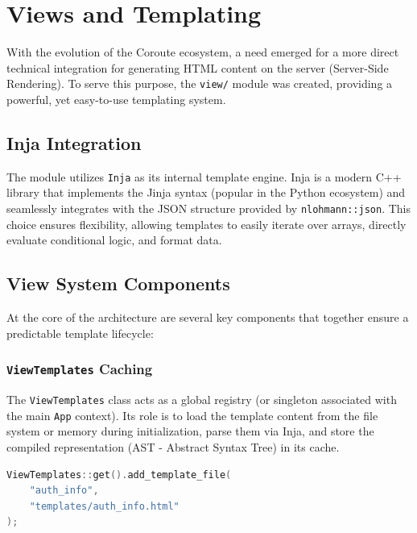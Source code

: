 \section{Views and Templating}
\label{sec:views-templating}

With the evolution of the Coroute ecosystem, a need emerged for a more direct technical integration for generating HTML content on the server (Server-Side Rendering). To serve this purpose, the \texttt{view/} module was created, providing a powerful, yet easy-to-use templating system.

\subsection{Inja Integration}
The module utilizes \texttt{Inja} as its internal template engine. Inja is a modern C++ library that implements the Jinja syntax (popular in the Python ecosystem) and seamlessly integrates with the JSON structure provided by \texttt{nlohmann::json}. This choice ensures flexibility, allowing templates to easily iterate over arrays, directly evaluate conditional logic, and format data.

\subsection{View System Components}

At the core of the architecture are several key components that together ensure a predictable template lifecycle:

\subsubsection{\texttt{ViewTemplates} Caching}
The \texttt{ViewTemplates} class acts as a global registry (or singleton associated with the main \texttt{App} context). Its role is to load the template content from the file system or memory during initialization, parse them via Inja, and store the compiled representation (AST - Abstract Syntax Tree) in its cache.

\begin{lstlisting}[language=C++, basicstyle=\small\ttfamily, caption={Configuring ViewTemplates}]
ViewTemplates::get().add_template_file(
    "auth_info", 
    "templates/auth_info.html"
);
\end{lstlisting}

